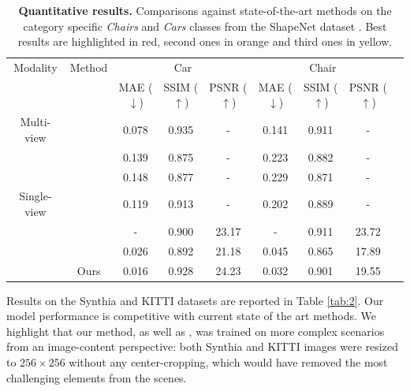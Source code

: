 \begin{table}[h!]
    \caption{\textbf{Quantitative results.} Comparisons against state-of-the-art methods on the category specific \textit{Chairs} and \textit{Cars} classes from the ShapeNet dataset \citep{chang2015shapenet}. Best results are highlighted in \colorbox{red!25}{red}, second ones in \colorbox{orange!25}{orange} and third ones in \colorbox{yellow!25}{yellow}. }
    \label{tab:1}
    \begin{center}%
    \begin{adjustbox}{width = \linewidth}
    \begin{tabular}[h]{c||cccccccc}
    \hline
     Modality & Method & \multicolumn{3}{c}{Car} & \multicolumn{3}{c}{Chair} \\
     & &  MAE ($\downarrow$) & SSIM ($\uparrow$) & PSNR ($\uparrow$) & MAE ($\downarrow$) & SSIM ($\uparrow$) & PSNR ($\uparrow$)\\
    \hline
    Multi-view & \citep{sun2018multiview}& 0.078 & 0.935 & - & 0.141 & 0.911 & - \\
    \hline
     & \citep{tatarchenko2015single} & 0.139 & 0.875 & - & 0.223 & 0.882 & -\\
    &  \citep{zhou2016view} & 0.148 & 0.877 & - & 0.229 & 0.871 & - \\
    Single-view &  \citep{park2017transformation} & \cellcolor{yellow!25}0.119 & \cellcolor{orange!25}0.913 & - & \cellcolor{yellow!25}0.202 & \cellcolor{yellow!25}0.889& -\\
     &  \citep{yu2021pixelnerf} & - & \cellcolor{yellow!25}0.900 & \cellcolor{orange!25}23.17 & - & \cellcolor{red!25}0.911 & \cellcolor{red!25}23.72 \\
     &  \citep{kim2020novel} & \cellcolor{orange!25}0.026 & 0.892 & \cellcolor{yellow!25}21.18 & \cellcolor{orange!25}0.045 & 0.865 & \cellcolor{yellow!25}17.89 \\
     & Ours & \cellcolor{red!25}0.016 & \cellcolor{red!25}0.928 & \cellcolor{red!25}24.23 & \cellcolor{red!25}0.032 & \cellcolor{orange!25}0.901 & \cellcolor{orange!25}19.55 \\
     
    \hline 
    \end{tabular}
    \end{adjustbox}
    \end{center}
    \end{table}

 Results on the Synthia \citep{ros2016synthia} and KITTI \citep{geiger2012we} datasets are reported in Table \ref{tab:2}. Our model performance is competitive with current state of the art methods. We highlight that our method, as well as \citep{kim2020novel}, was trained on more complex scenarios from an image-content perspective: both Synthia and KITTI images were resized to $256\times 256$ without any center-cropping, which would have removed the most challenging elements from the scenes.

